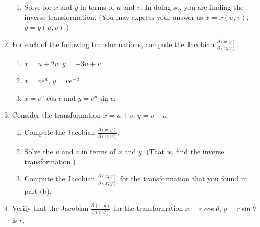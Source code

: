 \documentclass[12pt]{article}
\newif\ifans
\begin{document}
\begin{enumerate}
\begin{enumerate}
\item Solve for $x$ and $y$ in terms of $u$ and $v$.  In doing so, you are finding the inverse transformation.  (You may express your answer as $x=x(u,v)$, $y=y(u,v)$.)

\ifans{\fbox{$x=\ln\left(\frac{1}{2}(v-u)\right)$ (where $v>u$), $y=\frac{1}{2}(u+v)$}} \fi

\end{enumerate}

\item For each of the following transformations, compute the Jacobian $\frac{\partial(x,y)}{\partial(u,v)}$.

\begin{enumerate}

\item $x=u+2v$, $y=-3u+v$

\ifans{\fbox{7}} \fi

\item $x=ve^u$, $y=ve^{-u}$

\ifans{\fbox{$2v$}} \fi

\item $x=e^{u}\cos{v}$ and $y=e^{u}\sin{v}$.  

\ifans{\fbox{$e^{2u}$}} \fi

\end{enumerate}

\item Consider the transformation $x=u+v$, $y=v-u$.

\begin{enumerate}

\item Compute the Jacobian $\frac{\partial(x,y)}{\partial(u,v)}$.

\ifans{\fbox{2}} \fi

\item Solve the $u$ and $v$ in terms of $x$ and $y$. (That is, find the inverse transformation.)

\ifans{\fbox{$u=\frac{1}{2}(x-y)$, $v=\frac{1}{2}(x+y)$}} \fi

\item Compute the Jacobian $\frac{\partial(u,v)}{\partial(x,y)}$ for the transformation that you found in part (b).

\ifans{\fbox{$\frac{1}{2}$}} \fi

\end{enumerate}

\item Verify that the Jacobian $\frac{\partial(x,y)}{\partial(r,\theta)}$ for the transformation $x=r\cos{\theta}$, $y=r\sin{\theta}$ is $r$.


\end{enumerate}
\end{document}
